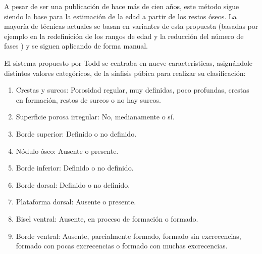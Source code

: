A pesar de ser una publicación de hace más de cien años, este método sigue siendo la base para la estimación de la edad a partir de los restos óseos. La mayoría de técnicas actuales se basan en variantes de esta propuesta (basadas por ejemplo en la redefinición de los rangos de edad y la reducción del número de fases \cite{sucheyBrooks}) y se siguen aplicando de forma manual.

El sistema propuesto por Todd se centraba en nueve características, asignándole distintos valores categóricos, de la sínfisis púbica para realizar su clasificación:

\begin{enumerate}
	\item Crestas y surcos: Porosidad regular, muy definidas, poco profundas, crestas en formación, restos de surcos o no hay surcos.
	\item Superficie porosa irregular: No, medianamente o sí.
	\item Borde superior: Definido o no definido.
	\item Nódulo óseo: Ausente o presente.
	\item Borde inferior: Definido o no definido.
	\item Borde dorsal: Definido o no definido.
	\item Plataforma dorsal: Ausente o presente.
	\item Bisel ventral: Ausente, en proceso de formación o formado.
	\item Borde ventral: Ausente, parcialmente formado, formado sin excrecencias, formado con pocas excrecencias o formado con muchas excrecencias.
\end{enumerate}

